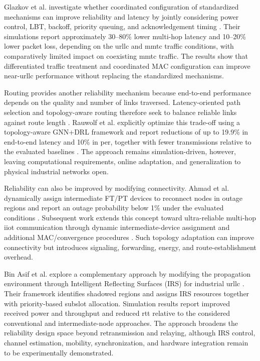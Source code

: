 Glazkov et al. investigate whether coordinated configuration of standardized
mechanisms can improve reliability and latency by jointly considering power
control, LBT, backoff, priority queuing, and acknowledgement timing
\cite{glazkovImprovingNearURLLCServices2025}. Their simulations report
approximately 30--80\% lower multi-hop latency and 10--20\% lower packet loss,
depending on the \gls{urllc} and \gls{mmtc} traffic conditions, with
comparatively limited impact on coexisting \gls{mmtc} traffic. The results
show that differentiated traffic treatment and coordinated MAC configuration
can improve near-\gls{urllc} performance without replacing the standardized
mechanisms.

Routing provides another reliability mechanism because end-to-end performance
depends on the quality and number of links traversed. Latency-oriented path
selection and topology-aware routing therefore seek to balance reliable links
against route length
\cite{asifURLLCBasedMultiHopCommunication2025,
rauwolfTopologyAwareDeepReinforcement2026a}. Rauwolf et al. explicitly
optimize this trade-off using a topology-aware GNN+DRL framework and report
reductions of up to 19.9\% in end-to-end latency and 10\% in \gls{per},
together with fewer transmissions relative to the evaluated baselines
\cite{rauwolfTopologyAwareDeepReinforcement2026a}. The approach remains
simulation-driven, however, leaving computational requirements, online
adaptation, and generalization to physical industrial networks open.

Reliability can also be improved by modifying connectivity. Ahmad et al.
dynamically assign intermediate FT/PT devices to reconnect nodes in outage
regions and report an outage probability below 1\% under the evaluated
conditions
\cite{ahmadMACProtocolReducing2024}. Subsequent work extends this concept
toward ultra-reliable multi-hop \gls{iiot} communication through dynamic
intermediate-device assignment and additional MAC/convergence procedures
\cite{ahmadMACLayerProtocolUltraReliable2025}. Such topology adaptation can
improve connectivity but introduces signaling, forwarding, energy, and
route-establishment overhead.

Bin Asif et al. explore a complementary approach by modifying the propagation
environment through Intelligent Reflecting Surfaces (IRS) for industrial
\gls{urllc}
\cite{binasifIRSAssistedDECT2020NR2025}. Their framework identifies shadowed
regions and assigns IRS resources together with priority-based subslot
allocation. Simulation results report improved received power and throughput
and reduced \gls{rtt} relative to the considered conventional and
intermediate-node approaches. The approach broadens the reliability design
space beyond retransmission and relaying, although IRS control, channel
estimation, mobility, synchronization, and hardware integration remain to be
experimentally demonstrated.

